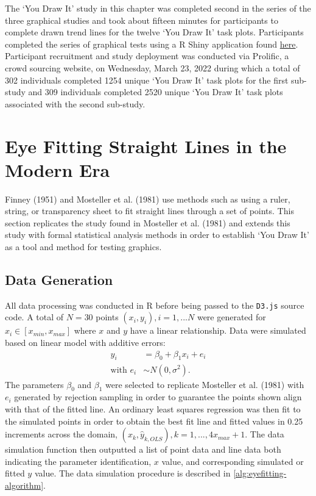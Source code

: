 \documentclass[print]{nuthesis}
\begin{document}
The `You Draw It' study in this chapter was completed second in the series of the three graphical studies and took about fifteen minutes for participants to complete drawn trend lines for the twelve `You Draw It' task plots.
Participants completed the series of graphical tests using a R Shiny application found \href{https://shiny.srvanderplas.com/perception-of-statistical-graphics/}{here}.
Participant recruitment and study deployment was conducted via Prolific, a crowd sourcing website, on Wednesday, March 23, 2022 during which a total of 302 individuals completed 1254 unique `You Draw It' task plots for the first sub-study and 309 individuals completed 2520 unique `You Draw It' task plots associated with the second sub-study.

\hypertarget{eye-fitting-straight-lines-in-the-modern-era}{%
\section{Eye Fitting Straight Lines in the Modern Era}\label{eye-fitting-straight-lines-in-the-modern-era}}

Finney (1951) and Mosteller et al. (1981) use methods such as using a ruler, string, or transparency sheet to fit straight lines through a set of points.
This section replicates the study found in Mosteller et al. (1981) and extends this study with formal statistical analysis methods in order to establish `You Draw It' as a tool and method for testing graphics.

\hypertarget{data-generation-1}{%
\subsection{Data Generation}\label{data-generation-1}}

All data processing was conducted in R before being passed to the \texttt{D3.js} source code.
A total of \(N = 30\) points \((x_i, y_i), i = 1,...N\) were generated for \(x_i \in [x_{min}, x_{max}]\) where \(x\) and \(y\) have a linear relationship.
Data were simulated based on linear model with additive errors:
\begin{align}
y_i & = \beta_0 + \beta_1 x_i + e_i \\
\text{with } e_i & \sim N(0, \sigma^2). \nonumber
\end{align}
The parameters \(\beta_0\) and \(\beta_1\) were selected to replicate Mosteller et al. (1981) with \(e_i\) generated by rejection sampling in order to guarantee the points shown align with that of the fitted line.
An ordinary least squares regression was then fit to the simulated points in order to obtain the best fit line and fitted values in 0.25 increments across the domain, \((x_k, \hat y_{k,OLS}), k = 1, ..., 4 x_{max} +1\).
The data simulation function then outputted a list of point data and line data both indicating the parameter identification, \(x\) value, and corresponding simulated or fitted \(y\) value.
The data simulation procedure is described in \cref{alg:eyefitting-algorithm}.
\end{document}
